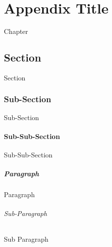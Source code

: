 \chapter{Appendix Title}\label{appch:example-chapter}
	Chapter

	\section{Section}\label{appsec:example-section}
		Section

		\subsection{Sub-Section}\label{appssec:example-subsection}
			Sub-Section

			\subsubsection{Sub-Sub-Section}\label{appsssec:example-subsubsection}
				Sub-Sub-Section

				\paragraph{Paragraph}\label{apppar:example-paragraph} 
					Paragraph

					\subparagraph{Sub-Paragraph}\label{appspar:example-subparagraph} 
						Sub Paragraph
